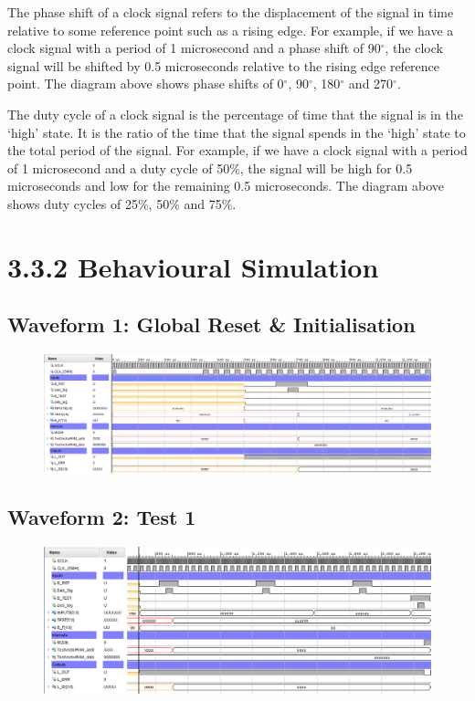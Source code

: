 \documentclass[11pt]{report}
\begin{document}
The phase shift of a clock signal refers to the displacement of the signal in time relative to some reference point such as a rising edge. For example, if we have a clock signal with a period of 1 microsecond and a phase shift of 90$^{\circ}$, the clock signal will be shifted by 0.5 microseconds relative to the rising edge reference point. The diagram above shows phase shifts of 0$^{\circ}$, 90$^{\circ}$, 180$^{\circ}$ and 270$^{\circ}$.

The duty cycle of a clock signal is the percentage of time that the signal is in the `high' state. It is the ratio of the time that the signal spends in the `high' state to the total period of the signal. For example, if we have a clock signal with a period of 1 microsecond and a duty cycle of 50\%, the signal will be high for 0.5 microseconds and low for the remaining 0.5 microseconds. The diagram above shows duty cycles of 25\%, 50\% and 75\%.




\section*{3.3.2 Behavioural Simulation}
\subsection*{Waveform 1: Global Reset \& Initialisation}
\begin{figure}[H]
    \includegraphics[width=\columnwidth]{Reports/Lab4/Assets/3.3.2_reset.png}
\end{figure}

\subsection*{Waveform 2: Test 1}
\begin{figure}[H]
    \includegraphics[width=\columnwidth]{Reports/Lab4/Assets/3.3.2_test1.png}
\end{figure}
\end{document}
